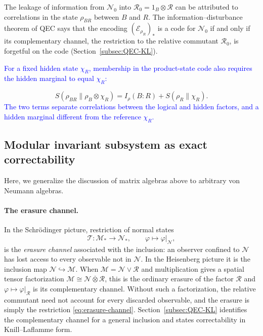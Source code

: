 \documentclass[a4paper,11pt]{article}
\theoremstyle{definition}
\newcommand{\mR}{\mathcal{R}}
\newcommand{\mN}{\mathcal{N}}
\newcommand{\mM}{\mathcal{M}}
\newcommand{\NL}[1]{\textcolor{blue}{#1}}
\newcommand{\mE}{\mathcal{E}}
\begin{document}
The leakage of information from $\mN_0$ into $\mR_0=1_B\otimes \mR$ can be attributed to correlations in the state $\rho_{BR}$ between $B$ and $R$. The information--disturbance theorem of QEC says that the encoding $(\mE_{\rho_R})_*$ is a code for $\mN_0$ if and only if its complementary channel, the restriction to the relative commutant $\mR_0$, is forgetful on the code (Section~\ref{subsec:QEC-KL}).

\NL{For a fixed hidden state $\chi_R$, membership in the product-state code also requires the hidden marginal to equal $\chi_R$:}

\begin{equation}\label{eq:quantum-coarse-entropy-decomposition}
 S(\rho_{BR}\|\rho_B\otimes\chi_R)=I_\rho(B:R)+S(\rho_R\|\chi_R).
\end{equation}
\NL{The two terms separate correlations between the logical and hidden factors, and a hidden marginal different from the reference $\chi_R$.}

\subsection{Modular invariant subsystem as exact correctability}\label{subsec:QEC-takesaki}

Here, we generalize the discussion of matrix algebras above to arbitrary von Neumann algebras.

\paragraph{The erasure channel.}
In the Schr\"odinger picture, restriction of normal states
\begin{equation}
 \mathcal T:\mM_*\to\mN_*,\qquad \varphi\mapsto\varphi|_{\mN},
 \label{eq:erasure-channel}
\end{equation}
is the \emph{erasure channel} associated with the inclusion: an observer confined to $\mN$ has lost access to every observable not in $\mN$. In the Heisenberg picture it is the inclusion map $\mN\hookrightarrow\mM$. When $\mM=\mN\vee\mR$ and multiplication gives a spatial tensor factorization $\mM\cong\mN\overline\otimes\mR$, this is the ordinary erasure of the factor $\mR$ and $\varphi\mapsto\varphi|_{\mR}$ is its complementary channel. Without such a factorization, the relative commutant need not account for every discarded observable, and the erasure is simply the restriction \eqref{eq:erasure-channel}. Section~\ref{subsec:QEC-KL} identifies the complementary channel for a general inclusion and states correctability in Knill--Laflamme form.
\end{document}
